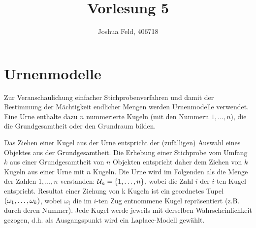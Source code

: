 \documentclass{lecture}
\institute{Institut für Statistik und Wirtschaftsmathematik}
\title{Vorlesung 5}
\author{Joshua Feld, 406718}
\begin{document}
    \maketitle


    \section*{Urnenmodelle}

    Zur Veranschaulichung einfacher Stichprobenverfahren und damit der Bestimmung der Mächtigkeit endlicher Mengen werden Urnenmodelle verwendet.
    Eine Urne enthalte dazu \(n\) nummerierte Kugeln (mit den Nummern \(1, \ldots, n\)), die die Grundgesamtheit oder den Grundraum bilden.
    
    Das Ziehen einer Kugel aus der Urne entspricht der (zufälligen) Auswahl eines Objektes aus der Grundgesamtheit.
    Die Erhebung einer Stichprobe vom Umfang \(k\) aus einer Grundgesamtheit von \(n\) Objekten entspricht daher dem Ziehen von \(k\) Kugeln aus einer Urne mit \(n\) Kugeln.
    Die Urne wird im Folgenden als die Menge der Zahlen \(1, \ldots, n\) verstanden: \(\mathcal{U}_n = \braces*{1, \ldots, n}\), wobei die Zahl \(i\) der \(i\)-ten Kugel entspricht.
    Resultat einer Ziehung von k Kugeln ist ein geordnetes Tupel \(\parentheses*{\omega_1, \ldots, \omega_k}\), wobei \(\omega_i\) die im \(i\)-ten Zug entnommene Kugel repräsentiert (z.B. durch deren Nummer).
    Jede Kugel werde jeweils mit derselben Wahrscheinlichkeit gezogen, d.h. als Ausgangspunkt wird ein Laplace-Modell gewählt.
\end{document}
